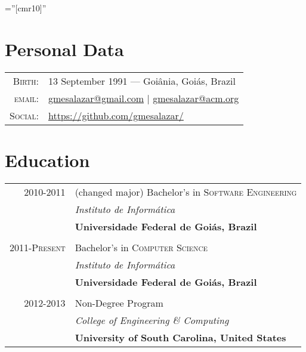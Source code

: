 \documentclass[a4paper,10pt]{article}
\begin{document}
\pagestyle{empty}

\font\fb=''[cmr10]''

\par{\bigskip\par}


\section{Personal Data}

\begin{tabular}{r p{3.5in}}
  \textsc{Birth:} & 13 September 1991 \hspace{0.5em}---\hspace{0.5em} Goiânia, Goiás, Brazil\\
  \textsc{email:}     & \href{mailto:gmesalazar@gmail.com}{gmesalazar@gmail.com} | \href{mailto:gmesalazar@acm.org}{gmesalazar@acm.org}\\
  \textsc{Social:} & \href{https://github.com/gmesalazar/}{https://github.com/gmesalazar/}
\end{tabular}

\section{Education}
\begin{tabular}{r p{12cm}}

  \textsc{2010-2011} & (changed major) Bachelor's in \textsc{Software Engineering}\\ &
  \emph{Instituto de Informática}\\ &
  \textbf{Universidade Federal de Goiás, Brazil}
  \\&\\
  \textsc{2011-Present} & Bachelor's in \textsc{Computer Science}\\ &
  \emph{Instituto de Informática}\\ &
  \textbf{Universidade Federal de Goiás, Brazil}
  \\&\\
  \textsc{2012-2013} & Non-Degree Program\\ &
  \emph{College of Engineering \& Computing}\\ &
  \textbf{University of South Carolina, United States}

\end{tabular}
\end{document}
